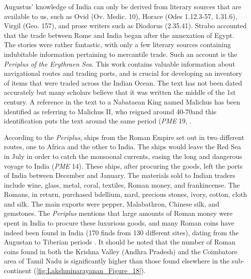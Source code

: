 Augustus’ knowledge of India can only be derived from literary sources that are available to us, such as Ovid (Ov. Medic. 10), Horace (Odes 1.12.3-57, 1.31.6), Virgil (Geo. 157), and prose writers such as Diodorus (2.35.41). Strabo accounted that the trade between Rome and India began after the annexation of Egypt. The stories were rather fantastic, with only a few literary sources containing indubitable information pertaining to mercantile trade. Such an account is the \emph{Periplus of the Erythraen Sea}. This work contains valuable information about navigational routes and trading ports, and is crucial for developing an inventory of items that were traded across the Indian Ocean. The text has not been dated accurately but many scholars believe that it was written the middle of the 1st century\AD \parencite[][98]{charlesworth1928}.%
A reference in the text to a Nabataean King named Malichus has been identified as referring to Malichus II, who reigned around 40-70\AD and this identification puts the text around the same period (\emph{PME} 19, \cite[][9-35]{dihle1965}.%

According to the \emph{Periplus}, ships from the Roman Empire set out in two different routes, one to Africa and the other to India. The ships would leave the Red Sea in July in order to catch the monsoonal currents, easing the long and dangerous voyage to India (\emph{PME} 14). These ships, after procuring the goods, left the ports of India between December and January. The materials sold to Indian traders include wine, glass, metal, coral, textiles, Roman money, and frankincense. The Romans, in return, purchased bdellium, nard, precious stones, ivory, cotton, cloth and silk. The main exports were pepper, Malabathron, Chinese silk, and gemstones. The \emph{Periplus} mentions that large amounts of Roman money were spent in India to procure these luxurious goods, and many Roman coins have indeed been found in India (170 finds from 130 different sites), dating from the Augustan to Tiberian periods \parencite[][]{turner1989}. It should be noted that the number of Roman coins found in both the Krishna Valley (Andhra Pradesh) and the Coimbatore area of Tamil Nadu is significantly higher than those found elsewhere in the sub-continent (\cref{fig:Lakshminarayanan_Figure_18}).

